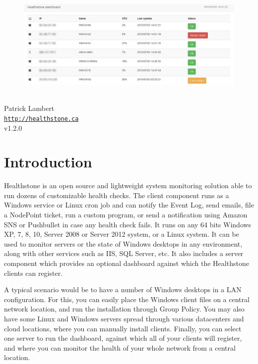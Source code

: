 \documentclass[11pt]{article}
\begin{document}
\begin{titlepage}
\bigskip
\begin{center}
\begin{figure}
\includegraphics[scale=0.6]{splash.jpg}
\end{figure}
\vspace*{1cm}
{
{\Huge \color{headings}{Healthstone Monitoring System}}\\
\bigskip
{\Large Patrick Lambert}\\
\texttt{\url{http://healthstone.ca}}\\
\bigskip
v1.2.0}
\vspace*{\fill}
\end{center}
\end{titlepage}

\tableofcontents

\newpage

\section{Introduction}

Healthstone is an open source and lightweight system monitoring solution able to run dozens of customizable health checks. The client component runs as a Windows service or Linux cron job and can notify the Event Log, send emails, file a NodePoint ticket, run a custom program, or send a notification using Amazon SNS or Pushbullet in case any health check fails. It runs on any 64 bits Windows XP, 7, 8, 10, Server 2008 or Server 2012 system, or a Linux system. It can be used to monitor servers or the state of Windows desktops in any environment, along with other services such as IIS, SQL Server, etc. It also includes a server component which provides an optional dashboard against which the Healthstone clients can register.

A typical scenario would be to have a number of Windows desktops in a LAN configuration. For this, you can easily place the Windows client files on a central network location, and run the installation through Group Policy. You may also have some Linux and Windows servers spread through various datacenters and cloud locations, where you can manually install clients. Finally, you can select one server to run the dashboard, against which all of your clients will register, and where you can monitor the health of your whole network from a central location.
\end{document}
